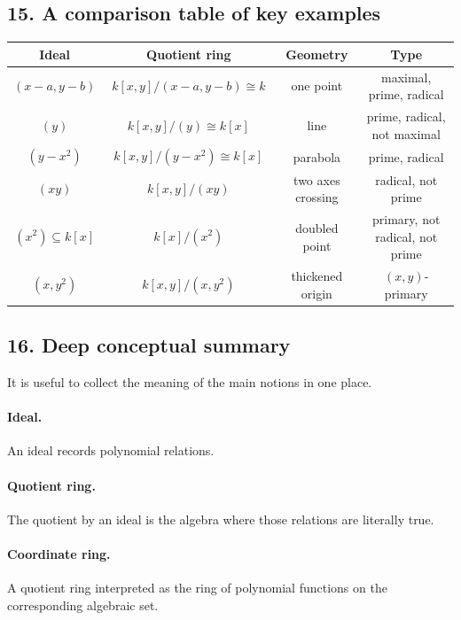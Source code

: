 \documentclass[12pt,a4paper]{article}
\theoremstyle{plain}
\theoremstyle{definition}      %
\begin{document}
	\subsection*{15. A comparison table of key examples}
	
	\begin{center}
		\renewcommand{\arraystretch}{1.4}
		\begin{tabular}{|c|c|c|c|}
			\hline
			\textbf{Ideal} & \textbf{Quotient ring} & \textbf{Geometry} & \textbf{Type} \\
			\hline
			\((x-a,y-b)\) &
			\(\;k[x,y]/(x-a,y-b)\cong k\;\) &
			one point &
			maximal, prime, radical \\
			\hline
			\((y)\) &
			\(\;k[x,y]/(y)\cong k[x]\;\) &
			line &
			prime, radical, not maximal \\
			\hline
			\((y-x^2)\) &
			\(\;k[x,y]/(y-x^2)\cong k[x]\;\) &
			parabola &
			prime, radical \\
			\hline
			\((xy)\) &
			\(\;k[x,y]/(xy)\;\) &
			two axes crossing &
			radical, not prime \\
			\hline
			\((x^2)\subseteq k[x]\) &
			\(\;k[x]/(x^2)\;\) &
			doubled point &
			primary, not radical, not prime \\
			\hline
			\((x,y^2)\) &
			\(\;k[x,y]/(x,y^2)\;\) &
			thickened origin &
			\((x,y)\)-primary \\
			\hline
		\end{tabular}
	\end{center}
	
	\subsection*{16. Deep conceptual summary}
	
	It is useful to collect the meaning of the main notions in one place.
	
	\paragraph{Ideal.}
	An ideal records polynomial relations.
	
	\paragraph{Quotient ring.}
	The quotient by an ideal is the algebra where those relations are literally true.
	
	\paragraph{Coordinate ring.}
	A quotient ring interpreted as the ring of polynomial functions on the corresponding algebraic set.
	
\end{document}
